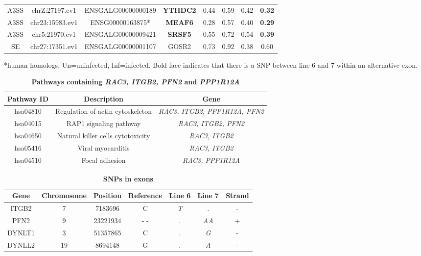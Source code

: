 \documentclass[10pt]{article}
\begin{document}
\begin{table}[!ht]
\begin{tabular}{cccccccc}
A3SS & chrZ:27197.ev1 & ENSGALG00000000189 & \textbf{YTHDC2} & 0.44 & 0.59 & 0.42 & \textbf{0.32} \\
A3SS & chr23:15983.ev1 & ENSG00000163875* & \textbf{MEAF6} & 0.28 & 0.57 & 0.40 & \textbf{0.29} \\
A3SS & chr5:21970.ev1 & ENSGALG00000009421 & \textbf{SRSF5} & 0.55 & 0.72 & 0.54 & \textbf{0.39} \\
\hline
SE & chr27:17351.ev1 & ENSGALG00000001107 & GOSR2 & 0.73 & 0.92 & 0.38 & 0.60 \\
\hline
\end{tabular}
\begin{flushleft}
    *human homologs, Un=uninfected, Inf=infected.
    Bold face indicates that there is a SNP between line 6 and 7 within an alternative exon.
\end{flushleft}
\label{tab:line67i_diff_line67u_three}
\end{table}

\begin{table}[!ht]
\caption{
\bf{Pathways containing {\em RAC3, ITGB2, PFN2} and {\em PPP1R12A}}}
\begin{tabular}{ccc}
\hline
Pathway ID &  Description & Gene \\
\hline
hsa04810 & Regulation of actin cytoskeleton & {\em RAC3, ITGB2, PPP1R12A, PFN2} \\
hsa04015 & RAP1 signaling pathway & {\em RAC3, ITGB2, PFN2} \\
hsa04650 & Natural killer cells cytotoxicity & {\em RAC3, ITGB2} \\
hsa05416 & Viral myocarditis & {\em RAC3, ITGB2} \\
hsa04510 & Focal adhesion & {\em RAC3, PPP1R12A} \\
\hline
\end{tabular}
\begin{flushleft}
\end{flushleft}
\label{tab:integrin}
\end{table}

\begin{table}[!ht]
\caption{
\bf{SNPs in exons}}
\begin{tabular}{ccccccc}
\hline
Gene &  Chromosome & Position & Reference & Line 6 & Line 7 & Strand \\
\hline
ITGB2 & 7 & 7183696 & C & {\em T} & . & - \\
PFN2 & 9 & 23221934 & -  - & . & {\em AA} & + \\
DYNLT1 & 3 & 51357865 & C & . & {\em G} & - \\
DYNLL2 & 19 & 8694148 & G & . & {\em A} & - \\
\hline
\end{tabular}
\begin{flushleft}
\end{flushleft}
\label{tab:deu_snps}
\end{table}
\end{document}
